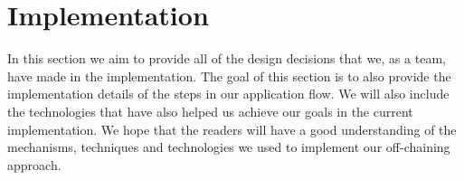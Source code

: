\section{Implementation}
\label{sec:approach-implementation}

In this section we aim to provide all of the design decisions that we, as a team, have made in the implementation. The goal of this section is to also provide the implementation details of the steps in our application flow. We will also include the technologies that have also helped us achieve our goals in the current implementation. We hope that the readers will have a good understanding of the mechanisms, techniques and technologies we used to implement our off-chaining approach.





